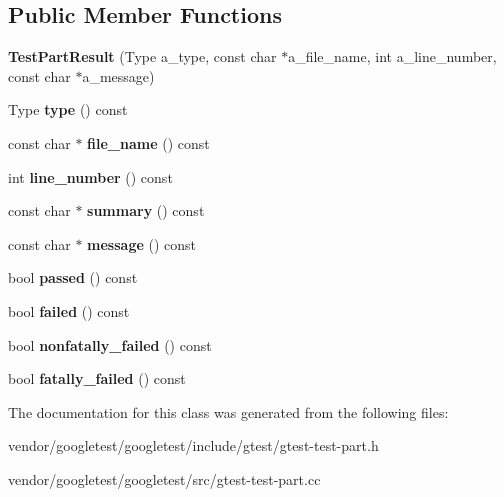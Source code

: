 \subsection*{Public Member Functions}
\begin{DoxyCompactItemize}
\item 
\mbox{\label{classtesting_1_1_test_part_result_a6409eb519c1cd514aab2426c8f40737f}} 
{\bfseries Test\+Part\+Result} (Type a\+\_\+type, const char $\ast$a\+\_\+file\+\_\+name, int a\+\_\+line\+\_\+number, const char $\ast$a\+\_\+message)
\item 
\mbox{\label{classtesting_1_1_test_part_result_aab92b225e8a472e78bd3889ca6df0d2a}} 
Type {\bfseries type} () const
\item 
\mbox{\label{classtesting_1_1_test_part_result_a0be40512f50a0086c4d3dc43938978aa}} 
const char $\ast$ {\bfseries file\+\_\+name} () const
\item 
\mbox{\label{classtesting_1_1_test_part_result_ad4c5da5f13245ac18cf256d0d9f3eda9}} 
int {\bfseries line\+\_\+number} () const
\item 
\mbox{\label{classtesting_1_1_test_part_result_a655ab538e510434ba557ad66c35aa42c}} 
const char $\ast$ {\bfseries summary} () const
\item 
\mbox{\label{classtesting_1_1_test_part_result_a5019dc9d753aba5949777270de255d49}} 
const char $\ast$ {\bfseries message} () const
\item 
\mbox{\label{classtesting_1_1_test_part_result_ac90edd5ea9cc4bb986a1eb2b5e1d53de}} 
bool {\bfseries passed} () const
\item 
\mbox{\label{classtesting_1_1_test_part_result_aa04b377c3e7ed57d39e882df5561ac90}} 
bool {\bfseries failed} () const
\item 
\mbox{\label{classtesting_1_1_test_part_result_a6197c7f6672acc1cfdf580eb1f2183ac}} 
bool {\bfseries nonfatally\+\_\+failed} () const
\item 
\mbox{\label{classtesting_1_1_test_part_result_a77db157eff9531c3c00c2420502f9a89}} 
bool {\bfseries fatally\+\_\+failed} () const
\end{DoxyCompactItemize}


The documentation for this class was generated from the following files\+:\begin{DoxyCompactItemize}
\item 
vendor/googletest/googletest/include/gtest/gtest-\/test-\/part.\+h\item 
vendor/googletest/googletest/src/gtest-\/test-\/part.\+cc\end{DoxyCompactItemize}

